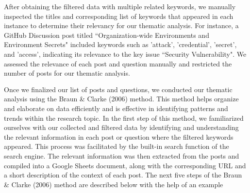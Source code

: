 \documentclass[conference]{IEEEtran}
\begin{document}
               After obtaining the filtered data with multiple related keywords, we manually inspected the titles and corresponding list of keywords that appeared in each instance to determine their relevancy for our thematic analysis. For instance, a GitHub Discussion post titled “Organization-wide Environments and Environment Secrets" included keywords such as 'attack', 'credential', 'secret', and 'access', indicating its relevance to the key issue “Security Vulnerability". We assessed the relevance of each post and question manually and restricted the number of posts for our thematic analysis.

	Once we finalized our list of posts and questions, we conducted our thematic analysis using the Braun \& Clarke (2006) method. This method helps organize and elaborate on data efficiently and is effective in identifying patterns and trends within the research topic. In the first step of this method, we familiarized ourselves with our collected and filtered data by identifying and understanding the relevant information in each post or question where the filtered keywords appeared. This process was facilitated by the built-in search function of the search engine. The relevant information was then extracted from the posts and compiled into a Google Sheets document, along with the corresponding URL and a short description of the context of each post. The next five steps of the Braun \& Clarke (2006) method are described below with the help of an example
\end{document}
